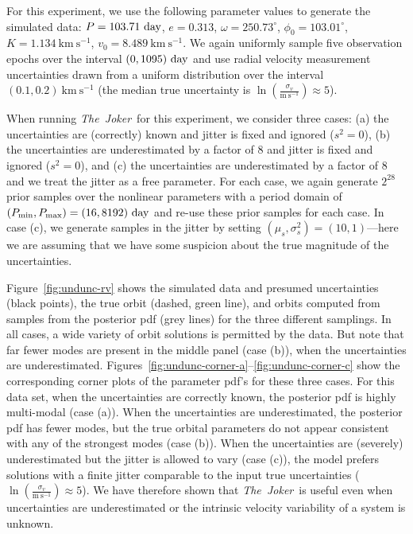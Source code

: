 \documentclass[manuscript, letterpaper]{aastex6}
\newcommand{\project}[1]{\textsl{#1}}
\newcommand{\samplername}{\project{The~Joker}}
\newcommand{\figname}{Figure}
\newcommand{\kms}{\mathrm{km}~\mathrm{s}^{-1}}
\newcommand{\mps}{\mathrm{m}~\mathrm{s}^{-1}}
\begin{document}
For this experiment, we use the following parameter values to generate the
simulated data: $P = 103.71~{\rm day}$, $e = 0.313$, $\omega = 250.73^\circ$,
$\phi_0 = 103.01^\circ$, $K = 1.134~\kms$, $v_0 = 8.489~\kms$.
We again uniformly sample five observation epochs over the interval $(0,1095)~{\rm
day}$ and use radial velocity measurement uncertainties drawn from a uniform
distribution over the interval $(0.1, 0.2)~\kms$ (the median true uncertainty is
$\ln \left(\frac{\sigma_v}{\mps}\right) \approx 5$).

When running \samplername\ for this experiment, we consider three cases:
(a) the uncertainties are (correctly) known and jitter is fixed and ignored ($s^2=0$), (b)
the uncertainties are underestimated by a factor of 8 and jitter is fixed and
ignored ($s^2=0$), and (c) the uncertainties are underestimated by a factor of 8
and we treat the jitter as a free parameter.
For each case, we again generate $2^{28}$ prior samples over the nonlinear
parameters with a period domain of $(P_{\rm min}, P_{\rm max}) = (16, 8192)~{\rm
day}$ and re-use these prior samples for each case.
In case (c), we generate samples in the jitter by setting
$(\mu_s,\sigma^2_s) = (10,1)$---here we are assuming that we have some suspicion
about the true magnitude of the uncertainties.

\figname~\ref{fig:undunc-rv} shows the simulated data and presumed uncertainties (black
points), the true orbit (dashed, green line), and orbits computed from samples
from the posterior pdf (grey lines) for the three different samplings.
In all cases, a wide variety of orbit solutions is permitted by the data. But
note that far fewer modes are present in the middle panel (case (b)), when the
uncertainties are underestimated.
\figname s~\ref{fig:undunc-corner-a}--\ref{fig:undunc-corner-c} show the
corresponding corner plots of the parameter pdf's for these three cases.
For this data set, when the uncertainties are correctly known, the posterior pdf is highly
multi-modal (case (a)).
When the uncertainties are underestimated, the posterior pdf has fewer modes,
but the true orbital parameters do not appear consistent with any of the
strongest modes (case (b)).
When the uncertainties are (severely) underestimated but the jitter is allowed to vary
(case (c)), the model prefers solutions with a finite jitter comparable to the
input true uncertainties ($\ln \left(\frac{\sigma_v}{\mps}\right) \approx 5$).
We have therefore shown that \samplername\ is useful even when uncertainties are
underestimated or the intrinsic velocity variability of a system is unknown.
\end{document}

